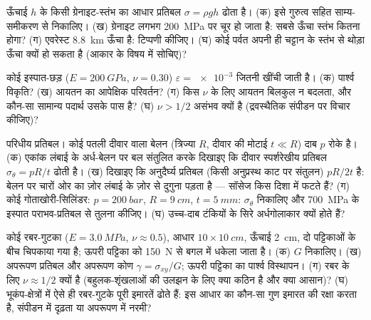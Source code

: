 \begin{exercise}[$\star$]\label{exo:b3:continuum-elasticity:3}
ऊँचाई $h$ के किसी ग्रेनाइट-स्तंभ का आधार प्रतिबल $\sigma
= \rho gh$ ढोता है। (क) इसे गुरुत्व सहित साम्य-समीकरण से
निकालिए। (ख) ग्रेनाइट लगभग \qty{200}{MPa} पर चूर हो जाता है: सबसे
ऊँचा स्तंभ कितना होगा? (ग) एवरेस्ट \qty{8.8}{km} ऊँचा है: टिप्पणी
कीजिए। (घ) कोई पर्वत अपनी ही चट्टान के स्तंभ से थोड़ा ऊँचा क्यों हो
सकता है (आकार के विषय में सोचिए)?
\end{exercise}

\begin{exercise}[$\star$]\label{exo:b3:continuum-elasticity:4}
कोई इस्पात-छड़ ($E = \qty{200}{GPa}$, $\nu = 0.30$)
$\varepsilon = \num{e-3}$ जितनी खींची जाती है। (क) पार्श्व विकृति?
(ख) आयतन का आपेक्षिक परिवर्तन? (ग) किस $\nu$ के लिए आयतन बिलकुल न
बदलता, और कौन-सा सामान्य पदार्थ उसके पास है? (घ) $\nu > 1/2$
असंभव क्यों है (द्रवस्थैतिक संपीडन पर विचार कीजिए)?
\end{exercise}

\begin{exercise}[$\star\star$]\label{exo:b3:continuum-elasticity:5}
परिधीय प्रतिबल। कोई पतली दीवार वाला बेलन (त्रिज्या $R$, दीवार की मोटाई $t \ll
R$) दाब $p$ रोके है। (क) एकांक लंबाई के अर्ध-बेलन पर बल संतुलित करके
दिखाइए कि दीवार स्पर्शरेखीय प्रतिबल
$\sigma_\theta = pR/t$ ढोती है। (ख) दिखाइए कि अनुदैर्घ्य प्रतिबल
(किसी अनुप्रस्थ काट पर संतुलन) $pR/2t$ है: बेलन पर चारों ओर का ज़ोर
लंबाई के ज़ोर से दुगुना पड़ता है --- सॉसेज किस दिशा में फटते हैं?
(ग) कोई गोताखोरी-सिलिंडर: $p =
\qty{200}{bar}$, $R = \qty{9}{cm}$, $t = \qty{5}{mm}$:
$\sigma_\theta$ निकालिए और \qty{700}{MPa} के इस्पात पराभव-प्रतिबल से
तुलना कीजिए। (घ) उच्च-दाब टंकियों के सिरे अर्धगोलाकार क्यों होते हैं?
\end{exercise}

\begin{exercise}[$\star\star$]\label{exo:b3:continuum-elasticity:6}
कोई रबर-गुटका ($E = \qty{3.0}{MPa}$, $\nu \approx 0.5$), आधार $10
\times \qty{10}{cm}$, ऊँचाई \qty{2}{cm}, दो पट्टिकाओं के बीच चिपकाया
गया है; ऊपरी पट्टिका को \qty{150}{N} से बगल में धकेला जाता है।
(क) $G$ निकालिए। (ख) अपरूपण प्रतिबल और अपरूपण कोण
$\gamma = \sigma_{xy}/G$; ऊपरी पट्टिका का पार्श्व
विस्थापन। (ग) रबर के लिए $\nu \approx 1/2$ क्यों है (बहुलक-शृंखलाओं
की उलझन के लिए क्या कठिन है और क्या आसान)? (घ) भूकंप-क्षेत्रों में ऐसे
ही रबर-गुटके पूरी इमारतें ढोते हैं: इस आधार का कौन-सा गुण इमारत की
रक्षा करता है, संपीडन में दृढ़ता या अपरूपण में नरमी?
\end{exercise}

